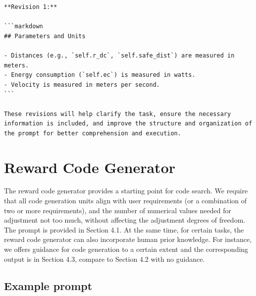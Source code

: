 \documentclass{article}
\begin{document}
\begin{verbatim}
**Revision 1:** 

```markdown
## Parameters and Units

- Distances (e.g., `self.r_dc`, `self.safe_dist`) are measured in meters.
- Energy consumption (`self.ec`) is measured in watts.
- Velocity is measured in meters per second.
```

These revisions will help clarify the task, ensure the necessary information is included, and improve the structure and organization of the prompt for better comprehension and execution.

\end{verbatim}


\section{Reward Code Generator} 

The reward code generator provides a starting point for code search. We require that all code generation units align with user requirements (or a combination of two or more requirements), and the number of numerical values needed for adjustment not too much, without affecting the adjustment degrees of freedom. The prompt is provided in Section 4.1. At the same time, for certain tasks, the reward code generator can also incorporate human prior knowledge. For instance, we offers guidance for code generation to a certain extent and the corresponding output is in Section 4.3, compare to Section 4.2 with no guidance.

\subsection{Example prompt}
\end{document}
